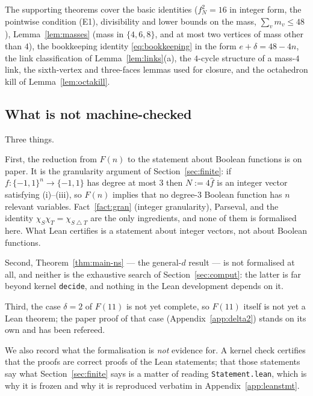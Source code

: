 \documentclass[11pt,reqno]{amsart}
\theoremstyle{plain}
\theoremstyle{definition}
\numberwithin{theorem}{section}
\newcommand{\cube}{\{-1,1\}}
\newcommand{\sd}{\mathbin{\triangle}}
\newcommand{\Fhat}[1]{\widehat{#1}}
\newif\ifleandone
\newcommand{\leanstate}[2]{\ifleandone #1\else #2\fi}
\begin{document}
The supporting theorems cover the basic identities ($f_N^2 = 16$ in integer form, the pointwise
condition (E1), divisibility and lower bounds on the mass, $\sum_v m_v \le 48$),
Lemma~\ref{lem:masses} (mass in $\{4,6,8\}$, and at most two vertices of mass other than $4$),
the bookkeeping identity \eqref{eq:bookkeeping} in the form $e + \delta = 48 - 4n$, the link
classification of Lemma~\ref{lem:links}(a), the $4$-cycle structure of a mass-$4$ link, the
sixth-vertex and three-faces lemmas used for closure, and the octahedron kill of
Lemma~\ref{lem:octakill}.

\subsection{What is not machine-checked}
Three things.

First, the reduction from $F(n)$ to the statement about Boolean functions is on paper. It is the
granularity argument of Section~\ref{sec:finite}: if $f \colon \cube^n \to \cube$ has degree at
most $3$ then $N := 4\Fhat{f}$ is an integer vector satisfying (i)--(iii), so $F(n)$ implies
that no degree-$3$ Boolean function has $n$ relevant variables. Fact~\ref{fact:gran} (integer
granularity), Parseval, and the identity $\chi_S\chi_T = \chi_{S \sd T}$ are the only
ingredients, and none of them is formalised here. What Lean certifies is a statement about
integer vectors, not about Boolean functions.

Second, Theorem~\ref{thm:main-ns} --- the general-$d$ result --- is not formalised at all, and
neither is the exhaustive search of Section~\ref{sec:comput}: the latter is far beyond kernel
\texttt{decide}, and nothing in the Lean development depends on it.

Third, \leanstate{nothing else: with \texttt{F\_twelve} and \texttt{F\_eleven} both proved, the
whole of Part~I and Appendix~\ref{app:cases} is covered in its finite form.}{the case
$\delta = 2$ of $F(11)$ is not yet complete, so $F(11)$ itself is not yet a Lean theorem; the
paper proof of that case (Appendix~\ref{app:delta2}) stands on its own and has been refereed.}

We also record what the formalisation is \emph{not} evidence for. A kernel check certifies that
the proofs are correct proofs of the Lean statements; that those statements say what
Section~\ref{sec:finite} says is a matter of reading \texttt{Statement.lean}, which is why it is
frozen and why it is reproduced verbatim in Appendix~\ref{app:leanstmt}.
\end{document}
